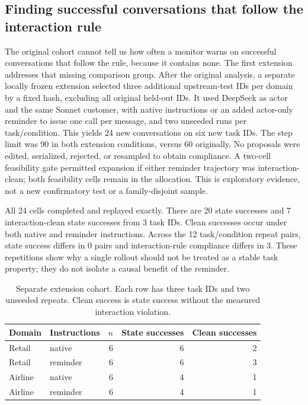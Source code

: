 \subsection{Finding successful conversations that follow the interaction rule}
\label{sec:extension}
The original cohort cannot tell us how often a monitor warns on successful conversations that follow the rule, because it contains none. The first extension addresses that missing comparison group. After the original analysis, a separate locally frozen extension selected three additional upstream-test IDs per domain by a fixed hash, excluding all original held-out IDs. It used DeepSeek as actor and the same Sonnet customer, with native instructions or an added actor-only reminder to issue one call per message, and two unseeded runs per task/condition. This yields 24 new conversations on six new task IDs. The step limit was 90 in both extension conditions, versus 60 originally. No proposals were edited, serialized, rejected, or resampled to obtain compliance. A two-cell feasibility gate permitted expansion if either reminder trajectory was interaction-clean; both feasibility cells remain in the allocation. This is exploratory evidence, not a new confirmatory test or a family-disjoint sample.

All 24 cells completed and replayed exactly. There are 20 state successes and 7 interaction-clean state successes from 3 task IDs. Clean successes occur under both native and reminder instructions. Across the 12 task/condition repeat pairs, state success differs in 0 pairs and interaction-rule compliance differs in 3. These repetitions show why a single rollout should not be treated as a stable task property; they do not isolate a causal benefit of the reminder.

\begin{table}[t]
\centering\small
\caption{Separate extension cohort. Each row has three task IDs and two unseeded repeats. Clean success is state success without the measured interaction violation.}
\label{tab:extension}
\begin{tabular}{llrrr}
\toprule
Domain & Instructions & $n$ & State successes & Clean successes\\
\midrule
Retail & native & 6 & 6 & 2\\
Retail & reminder & 6 & 6 & 3\\
Airline & native & 6 & 4 & 1\\
Airline & reminder & 6 & 4 & 1\\
\bottomrule
\end{tabular}
\end{table}
